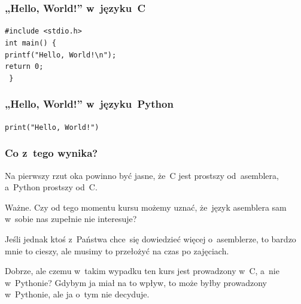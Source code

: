 \documentclass[10pt,t]{beamer}
\begin{document}
\begin{frame}
  \frametitle{„Hello, World!” w~języku~C}


  \texttt{\#include <stdio.h>} \\
  \vspace{0.8em}
  \texttt{int main() \{ } \\
  \hphantom{aaaa} \texttt{printf("Hello, World!\textbackslash n");} \\
  \vspace{0.8em}
  \vspace{0.8em}
  \vspace{0.8em}
  \vspace{0.8em}
  \hphantom{aaaa} \texttt{return 0;} \\
  \texttt{ \} }

\end{frame}





\begin{frame}
  \frametitle{„Hello, World!” w~języku~Python}


  \texttt{print("Hello, World!")}

\end{frame}





\begin{frame}
  \frametitle{Co z~tego wynika?}


  Na pierwszy rzut oka powinno być jasne, że~C jest prostszy od~asemblera,
  a~Python prostszy od~C.

  \alert{Ważne.} Czy od tego momentu kursu możemy uznać, że~język
  asemblera sam w~sobie nas zupełnie nie interesuje?

  Jeśli jednak ktoś z~Państwa chce~się dowiedzieć więcej o~asemblerze,
  to bardzo mnie to cieszy, ale musimy to przełożyć na czas po zajęciach.

  Dobrze, ale czemu w~takim wypadku ten kurs jest prowadzony w~C, a~nie
  w~Pythonie? Gdybym ja miał na to wpływ, to może byłby prowadzony
  w~Pythonie, ale ja o~tym nie decyduje.

\end{frame}
\end{document}
